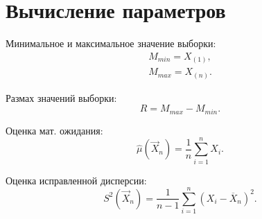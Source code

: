 \chapter{Вычисление параметров}

Минимальное и максимальное значение выборки:
\begin{equation}
\begin{aligned}
M_{min} = X_{(1)}, \\
M_{max} = X_{(n)}.
\end{aligned}
\end{equation}

Размах значений выборки:
\begin{equation}
R = M_{max} - M_{min}.
\end{equation}

Оценка мат. ожидания:
\begin{equation}
\hat \mu (\vec X_n) = \frac{1}{n} \sum_{i=1}^{n}X_i.
\end{equation}

Оценка исправленной дисперсии:
\begin{equation}
S^2 (\vec X_n) = \frac{1}{n - 1} \sum_{i=1}^{n} (X_i - \overline X_n)^2.
\end{equation}
